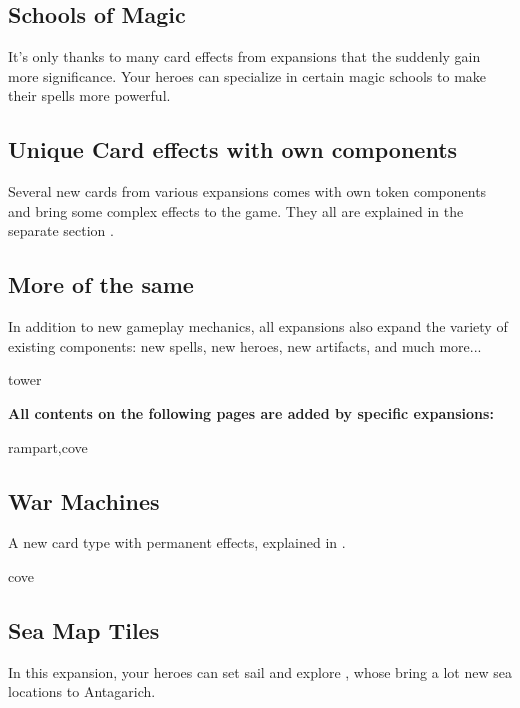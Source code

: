 \begin{multicols*}{2}
\subsection*{Schools of Magic}
It's only thanks to many card effects from expansions that the  suddenly gain more significance. Your heroes can specialize in certain magic schools to make their spells more powerful.

\subsection*{Unique Card effects with own components}
Several new cards from various expansions comes with own token components and bring some complex effects to the game. They all are explained in the separate section  .

\subsection*{More of the same}
In addition to new gameplay mechanics, all expansions also expand the variety of existing components: new spells, new heroes, new artifacts, and much more...

\begin{expansion}{tower}
\end{expansion}
\pagebreak

\textbf{All contents on the following pages are added by specific expansions:}

\begin{expansion}{rampart,cove}
\subsection*{War Machines}
  A new card type with permanent effects, explained in .
\end{expansion}

\vspace*{1em}
\begin{expansion}{cove}
	\subsection*{Sea Map Tiles}
	In this expansion, your heroes can set sail and explore , whose bring a lot new sea locations to Antagarich. 
\end{expansion}


\end{multicols*}

